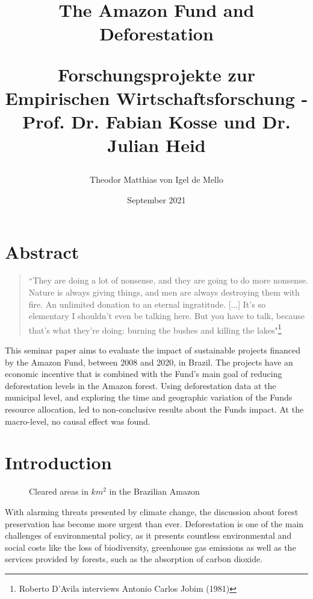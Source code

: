 \documentclass[11pt, oneside]{article}   	%
\title{The Amazon Fund and Deforestation
\vspace{5mm}


 \large Forschungsprojekte zur Empirischen Wirtschaftsforschung - Prof. Dr. Fabian Kosse und Dr. Julian Heid}
\author{Theodor Matthias von Igel de Mello}
\date{September 2021}							%
\begin{document}
\maketitle

\newpage
\tableofcontents
\newpage


\section{Abstract}

\begin{quotation}
``They are doing a lot of nonsense, and they are going to do more nonsense. Nature is always giving things, and men are always destroying them with fire. An unlimited donation to an eternal ingratitude. [...] It's so elementary I shouldn't even be talking here. But you have to talk, because that's what they're doing: burning the bushes and killing the lakes"\footnote{Roberto D'Avila interviews Antonio Carlos Jobim (1981)}
\end{quotation}

This seminar paper aims to evaluate the impact of sustainable projects financed by the Amazon Fund, between 2008 and 2020, in Brazil. The projects have an economic incentive that is combined with the Fund's main goal of reducing deforestation levels in the Amazon forest. Using deforestation data at the municipal level, and exploring the time and geographic variation of the Funds resource allocation, led to non-conclusive results about the Funds impact. At the macro-level, no causal effect was found. 

\section{Introduction}

\begin{figure}[!ht]
\centering

\caption{Cleared areas in $km^{2}$ in the Brazilian Amazon}
\end{figure}

With alarming threats presented by climate change, the discussion about forest preservation has become more urgent than ever. Deforestation is one of the main challenges of environmental policy, as it presents countless environmental and social costs like the loss of biodiversity, greenhouse gas emissions as well as the services provided by forests, such as the absorption of carbon dioxide. 
\end{document}
